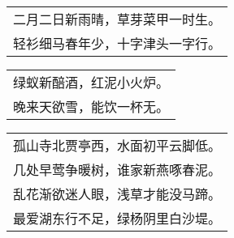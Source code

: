 \nopagebreak%
\nopagebreak%
\noindent\begin{minipage}{\linewidth}
  \vskip-3pt\begin{table}[H]
    \centering
    \begin{tabular}{@{}l@{}}
二月二日新雨晴，草芽菜甲一时生。\\
轻衫细马春年少，十字津头一字行。
    \end{tabular}
  \end{table}
\end{minipage}
\vspace{1cm}


\nopagebreak%
\nopagebreak%
\noindent\begin{minipage}{\linewidth}
  \vskip-3pt\begin{table}[H]
    \centering
    \begin{tabular}{@{}l@{}}
绿蚁新醅酒，红泥小火炉。\\
晚来天欲雪，能饮一杯无。
    \end{tabular}
  \end{table}
\end{minipage}
\vspace{1cm}


\nopagebreak%
\nopagebreak%
\noindent\begin{minipage}{\linewidth}
  \vskip-3pt\begin{table}[H]
    \centering
    \begin{tabular}{@{}l@{}}
孤山寺北贾亭西，水面初平云脚低。\\
几处早莺争暖树，谁家新燕啄春泥。\\
乱花渐欲迷人眼，浅草才能没马蹄。\\
最爱湖东行不足，绿杨阴里白沙堤。
    \end{tabular}
  \end{table}
\end{minipage}
\vspace{1cm}


